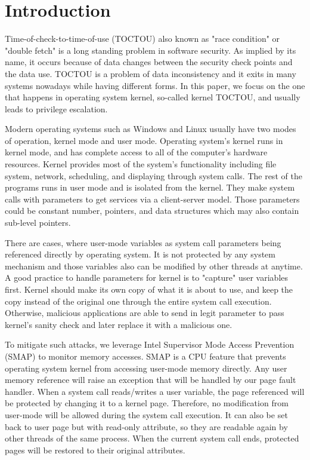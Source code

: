 
\section{Introduction}

Time-of-check-to-time-of-use (TOCTOU) also known as "race condition" or "double fetch" is a long standing problem in software security. As implied by its name, it occurs because of data changes between the security check points and the data use. TOCTOU is a problem of data inconsistency and it exits in many systems nowadays while having different forms. In this paper, we focus on the one that happens in operating system kernel, so-called kernel TOCTOU, and usually leads to privilege escalation.

Modern operating systems such as Windows and Linux usually have two modes of operation, kernel mode and user mode. Operating system's kernel runs in kernel mode, and has complete access to all of the computer's hardware resources. Kernel provides most of the system's functionality including file system, network, scheduling, and displaying through system calls. The rest of the programs runs in user mode and is isolated from the kernel. They make system calls with parameters to get services via a client-server model. Those parameters could be constant number, pointers, and data structures which may also contain sub-level pointers.

There are cases, where user-mode variables as system call parameters being referenced directly by operating system. It is not protected by any system mechanism and those variables also can be modified by other threads at anytime. A good practice to handle parameters for kernel is to "capture" user variables first. Kernel should make its own copy of what it is about to use, and keep the copy instead of the original one through the entire system call execution. Otherwise, malicious applications are able to send in legit parameter to pass kernel's sanity check and later replace it with a malicious one.

To mitigate such attacks, we leverage Intel Supervisor Mode Access Prevention (SMAP) to monitor memory accesses. SMAP is a CPU feature that prevents operating system kernel from accessing user-mode memory directly. Any user memory reference will raise an exception that will be handled by our page fault handler. When a system call reads/writes a user variable, the page referenced will be protected by changing it to a kernel page. Therefore, no modification from user-mode will be allowed during the system call execution. It can also be set back to user page but with read-only attribute, so they are readable again by other threads of the same process. When the current system call ends, protected pages will be restored to their original attributes. 

